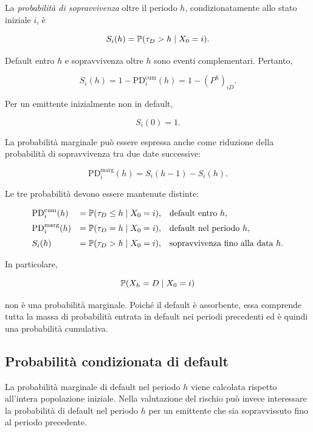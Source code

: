 \begin{definition}
La \emph{probabilit\`{a} di sopravvivenza} oltre il periodo $h$,
condizionatamente allo stato iniziale $i$, \`{e}

\[
S_i(h)
=
\mathbb{P}(\tau_D>h\mid X_0=i).
\]
\end{definition}

Default entro $h$ e sopravvivenza oltre $h$ sono eventi
complementari. Pertanto,

\[
S_i(h)
=
1-\mathrm{PD}_{i}^{\mathrm{cum}}(h)
=
1-(P^h)_{iD}.
\]

Per un emittente inizialmente non in default,

\[
S_i(0)=1.
\]

La probabilit\`{a} marginale pu\`{o} essere espressa anche come
riduzione della probabilit\`{a} di sopravvivenza tra due date
successive:

\[
\mathrm{PD}_{i}^{\mathrm{marg}}(h)
=
S_i(h-1)-S_i(h).
\]

Le tre probabilit\`{a} devono essere mantenute distinte:

\[
\begin{array}{lll}
\mathrm{PD}_{i}^{\mathrm{cum}}(h)
&
=
\mathbb{P}(\tau_D\leq h\mid X_0=i),
&
\text{default entro }h,
\\[2mm]
\mathrm{PD}_{i}^{\mathrm{marg}}(h)
&
=
\mathbb{P}(\tau_D=h\mid X_0=i),
&
\text{default nel periodo }h,
\\[2mm]
S_i(h)
&
=
\mathbb{P}(\tau_D>h\mid X_0=i),
&
\text{sopravvivenza fino alla data $h$}.
\end{array}
\]

In particolare,

\[
\mathbb{P}(X_h=D\mid X_0=i)
\]

non \`{e} una probabilit\`{a} marginale. Poich\'{e} il default \`{e}
assorbente, essa comprende tutta la massa di probabilit\`{a} entrata
in default nei periodi precedenti ed \`{e} quindi una probabilit\`{a}
cumulativa.

\subsection{Probabilit\`{a} condizionata di default}

\label{subsec:cap9-pd-condizionata}

La probabilit\`{a} marginale di default nel periodo $h$ viene
calcolata rispetto all'intera popolazione iniziale. Nella valutazione
del rischio pu\`{o} invece interessare la probabilit\`{a} di default
nel periodo $h$ per un emittente che sia sopravvissuto fino al
periodo precedente.

